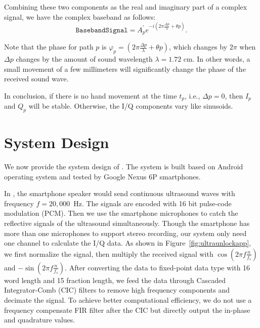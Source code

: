 Combining these two components as the real and imaginary part of a complex signal, we have the complex baseband as follows: 
\begin{displaymath}
\texttt{BasebandSignal} = A^\prime_p e^{-i \left(2 \pi \frac{\Delta p}{\lambda} + \theta p\right)}.
\end{displaymath}

Note that the phase for path $p$ is $\varphi_p = \left(2 \pi \frac{\Delta p}{\lambda} + \theta p\right)$, which changes by $2\pi$ when $\Delta p$ changes by the amount of sound wavelength $\lambda = 1.72 \text{~cm}$. In other words, a small
movement of a few millimeters will significantly change the phase of the received sound wave. 

In conclusion, if there is no hand movement at the time $t_p$, i.e., $\Delta p = 0$,  then $I_p$ and $Q_p$ will be stable. Otherwise, the I/Q components vary like sinusoids.

\section{System Design}
We now provide the system design of {\uu}. The system is built based on Android operating system and tested by Google Nexus 6P smartphones.

In {\uu}, the smartphone speaker would send continuous ultrasound waves with frequency $f = 20,000 $~Hz. The signals are encoded with 16 bit pulse-code modulation (PCM). Then we use the smartphone microphones to catch the reflective signals of the ultrasound simultaneously. Though the smartphone has more than one microphones to support stereo recording, our system only need one channel to calculate the I/Q data.  As shown in Figure~\ref{fig:ultraunlockapp}, we first normalize the signal, then multiply the received signal with $\cos \left (2\pi f \frac{n}{f_s}\right)$ and $-\sin \left (2\pi f \frac{n}{f_s}\right)$. After converting the data to fixed-point data type with 16 word length and 15 fraction length, we feed the data through Cascaded Integrator-Comb (CIC) filters to remove high frequency components and decimate the signal. To achieve better computational efficiency, we do not use a frequency compensate FIR filter after the CIC but directly output the in-phase and quadrature values.


